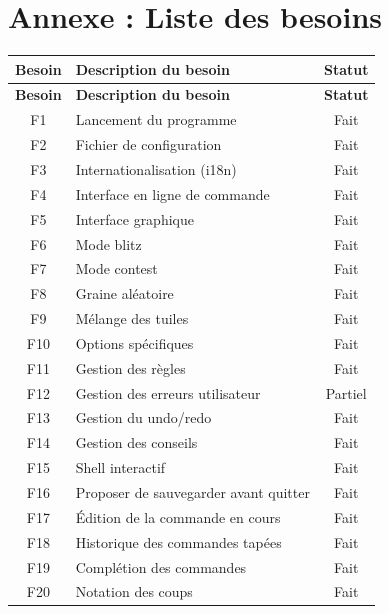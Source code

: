 \documentclass[11pt]{article}
\begin{document}

\nocite{*}



\newpage
\section{Annexe : Liste des besoins}

\begin{longtable}{|c|l|c|}
\hline
\textbf{Besoin} & \textbf{Description du besoin} & \textbf{Statut} \\
\hline
\endfirsthead

\hline
\textbf{Besoin} & \textbf{Description du besoin} & \textbf{Statut} \\
\hline
\endhead

F1 & Lancement du programme & Fait \\ \hline
F2 & Fichier de configuration & Fait \\ \hline
F3 & Internationalisation (i18n) & Fait \\ \hline
F4 & Interface en ligne de commande & Fait \\ \hline
F5 & Interface graphique & Fait \\ \hline
F6 & Mode blitz & Fait \\ \hline
F7 & Mode contest & Fait \\ \hline
F8 & Graine aléatoire & Fait \\ \hline
F9 & Mélange des tuiles & Fait \\ \hline
F10 & Options spécifiques & Fait \\ \hline

F11 & Gestion des règles & Fait \\ \hline
F12 & Gestion des erreurs utilisateur & Partiel \\ \hline
F13 & Gestion du undo/redo & Fait \\ \hline
F14 & Gestion des conseils & Fait \\ \hline

F15 & Shell interactif & Fait \\ \hline
F16 & Proposer de sauvegarder avant quitter & Fait \\ \hline
F17 & Édition de la commande en cours & Fait \\ \hline
F18 & Historique des commandes tapées & Fait \\ \hline
F19 & Complétion des commandes & Fait \\ \hline
F20 & Notation des coups & Fait \\ \hline


\end{longtable}
\end{document}
